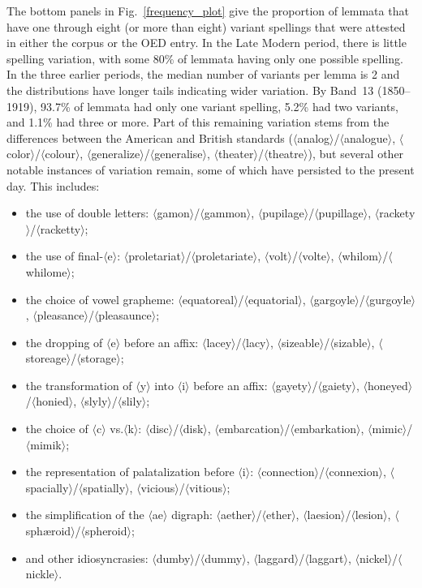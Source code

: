 \documentclass[doc,biblatex]{apa7}
\newcommand\spelling[1]{\allowbreak$\langle$#1$\rangle$}
\begin{document}
The bottom panels in Fig.~\ref{frequency_plot} give the proportion of lemmata that have one through eight (or more than eight) variant spellings that were attested in either the corpus or the OED entry. In the Late Modern period, there is little spelling variation, with some 80\% of lemmata having only one possible spelling. In the three earlier periods, the median number of variants per lemma is 2 and the distributions have longer tails indicating wider variation. By Band~13 (1850--1919), 93.7\% of lemmata had only one variant spelling, 5.2\% had two variants, and 1.1\% had three or more. Part of this remaining variation stems from the differences between the American and British standards (\spelling{analog}/\spelling{analogue}, \spelling{color}/\spelling{colour}, \spelling{generalize}/\spelling{generalise}, \spelling{theater}/\spelling{theatre}), but several other notable instances of variation remain, some of which have persisted to the present day. This includes:
\begin{itemize}
	\item the use of double letters: \spelling{gamon}/\spelling{gammon}, \spelling{pupilage}/\spelling{pupillage}, \spelling{rackety}/\spelling{racketty};
	\item the use of final-\spelling{e}: \spelling{proletariat}/\spelling{proletariate}, \spelling{volt}/\spelling{volte}, \spelling{whilom}/\spelling{whilome};
	\item the choice of vowel grapheme: \spelling{equatoreal}/\spelling{equatorial}, \spelling{gargoyle}/\spelling{gurgoyle}, \spelling{pleasance}/\spelling{pleasaunce};
	\item the dropping of \spelling{e} before an affix: \spelling{lacey}/\spelling{lacy}, \spelling{sizeable}/\spelling{sizable}, \spelling{storeage}/\spelling{storage};
	\item the transformation of \spelling{y} into \spelling{i} before an affix: \spelling{gayety}/\spelling{gaiety}, \spelling{honeyed}/\spelling{honied}, \spelling{slyly}/\spelling{slily};
	\item the choice of \spelling{c} vs.\@ \spelling{k}: \spelling{disc}/\spelling{disk}, \spelling{embarcation}/\spelling{embarkation}, \spelling{mimic}/\spelling{mimik};
	\item the representation of palatalization before \spelling{i}: \spelling{connection}/\spelling{connexion}, \spelling{spacially}/\spelling{spatially}, \spelling{vicious}/\spelling{vitious};
	\item the simplification of the \spelling{ae} digraph: \spelling{aether}/\spelling{ether}, \spelling{laesion}/\spelling{lesion}, \spelling{sphæroid}/\spelling{spheroid};
	\item and other idiosyncrasies: \spelling{dumby}/\spelling{dummy}, \spelling{laggard}/\spelling{laggart}, \spelling{nickel}/\spelling{nickle}.
\end{itemize}
\end{document}
